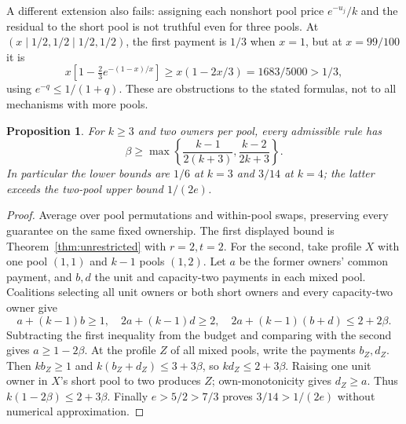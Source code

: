 \documentclass[11pt]{article}
\newtheorem{proposition}[theorem]{Proposition}
\theoremstyle{definition}\newtheorem{definition}[theorem]{Definition}
\theoremstyle{remark}\newtheorem{remark}[theorem]{Remark}
\begin{document}
A different extension also fails: assigning each nonshort pool price
$e^{-u_j}/k$ and the residual to the short pool is not truthful even for
three pools. At $(x\mid1/2,1/2\mid1/2,1/2)$, the first payment is
$1/3$ when $x=1$, but at $x=99/100$ it is
\[
 x\left[1-\tfrac23 e^{-(1-x)/x}\right]
 \ge x(1-2x/3)=1683/5000>1/3,
\]
using $e^{-q}\le1/(1+q)$. These are obstructions to the stated formulas,
not to all mechanisms with more pools.

\begin{proposition}\label{hist:small-stage-lower}
For $k\ge3$ and two owners per pool, every admissible rule has
\[
 \beta\ge\max\left\{\frac{k-1}{2(k+3)},\frac{k-2}{2k+3}\right\}.
\]
In particular the lower bounds are $1/6$ at $k=3$ and $3/14$ at $k=4$;
the latter exceeds the two-pool upper bound $1/(2e)$.
\end{proposition}
\begin{proof}
Average over pool permutations and within-pool swaps, preserving every
guarantee on the same fixed ownership. The first displayed bound is
Theorem~\ref{thm:unrestricted} with $r=2,t=2$.
For the second, take profile $X$ with one pool $(1,1)$ and $k-1$ pools
$(1,2)$. Let $a$ be the former owners' common payment, and $b,d$ the
unit and capacity-two payments in each mixed pool. Coalitions selecting
all unit owners or both short owners and every capacity-two owner give
\[
 a+(k-1)b\ge1,\quad 2a+(k-1)d\ge2,\quad
 2a+(k-1)(b+d)\le2+2\beta.
\]
Subtracting the first inequality from the budget and comparing with the
second gives $a\ge1-2\beta$. At the profile $Z$ of all mixed pools,
write the payments $b_Z,d_Z$. Then $kb_Z\ge1$ and
$k(b_Z+d_Z)\le3+3\beta$, so $kd_Z\le2+3\beta$.
Raising one unit owner in $X$'s short pool to two produces $Z$;
own-monotonicity gives $d_Z\ge a$. Thus
$k(1-2\beta)\le2+3\beta$. Finally $e>5/2>7/3$ proves
$3/14>1/(2e)$ without numerical approximation.
\end{proof}
\end{document}
